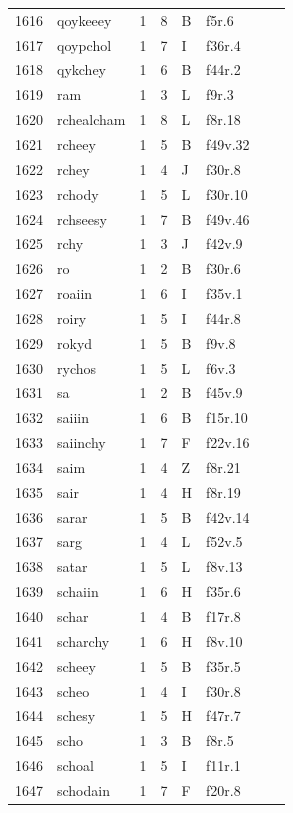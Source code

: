 \documentclass[11pt,a4paper]{article}
\begin{document}
\begin{landscape}
\begin{longtable}{@{}r>{\ttfamily}lrrl>{\ttfamily}l>{\raggedright\arraybackslash}p{80mm}>{\raggedright\arraybackslash}p{36mm}@{}}
1616 & qoykeeey & 1 & 8 & B & f5r.6 &  & \\
1617 & qoypchol & 1 & 7 & I & f36r.4 &  & \\
1618 & qykchey & 1 & 6 & B & f44r.2 &  & \\
1619 & ram & 1 & 3 & L & f9r.3 &  & \\
1620 & rchealcham & 1 & 8 & L & f8r.18 &  & \\
1621 & rcheey & 1 & 5 & B & f49v.32 &  & \\
1622 & rchey & 1 & 4 & J & f30r.8 &  & \\
1623 & rchody & 1 & 5 & L & f30r.10 &  & \\
1624 & rchseesy & 1 & 7 & B & f49v.46 &  & \\
1625 & rchy & 1 & 3 & J & f42v.9 &  & \\
1626 & ro & 1 & 2 & B & f30r.6 &  & \\
1627 & roaiin & 1 & 6 & I & f35v.1 &  & \\
1628 & roiry & 1 & 5 & I & f44r.8 &  & \\
1629 & rokyd & 1 & 5 & B & f9v.8 &  & \\
1630 & rychos & 1 & 5 & L & f6v.3 &  & \\
1631 & sa & 1 & 2 & B & f45v.9 &  & \\
1632 & saiiin & 1 & 6 & B & f15r.10 &  & \\
1633 & saiinchy & 1 & 7 & F & f22v.16 &  & \\
1634 & saim & 1 & 4 & Z & f8r.21 &  & \\
1635 & sair & 1 & 4 & H & f8r.19 &  & \\
1636 & sarar & 1 & 5 & B & f42v.14 &  & \\
1637 & sarg & 1 & 4 & L & f52v.5 &  & \\
1638 & satar & 1 & 5 & L & f8v.13 &  & \\
1639 & schaiin & 1 & 6 & H & f35r.6 &  & \\
1640 & schar & 1 & 4 & B & f17r.8 &  & \\
1641 & scharchy & 1 & 6 & H & f8v.10 &  & \\
1642 & scheey & 1 & 5 & B & f35r.5 &  & \\
1643 & scheo & 1 & 4 & I & f30r.8 &  & \\
1644 & schesy & 1 & 5 & H & f47r.7 &  & \\
1645 & scho & 1 & 3 & B & f8r.5 &  & \\
1646 & schoal & 1 & 5 & I & f11r.1 &  & \\
1647 & schodain & 1 & 7 & F & f20r.8 &  & \\

\end{longtable}
\end{landscape}
\end{document}
